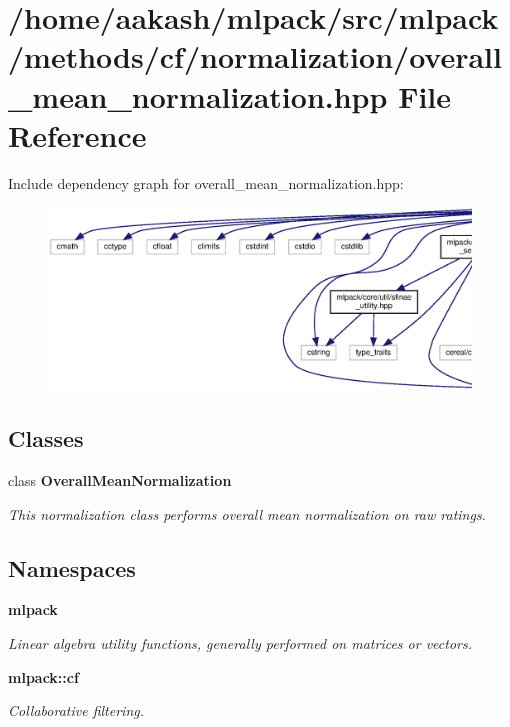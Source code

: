 \section{/home/aakash/mlpack/src/mlpack/methods/cf/normalization/overall\+\_\+mean\+\_\+normalization.hpp File Reference}
\label{overall__mean__normalization_8hpp}
Include dependency graph for overall\+\_\+mean\+\_\+normalization.\+hpp\+:
\nopagebreak
\begin{figure}[H]
\begin{center}
\leavevmode
\includegraphics[width=350pt]{overall__mean__normalization_8hpp__incl}
\end{center}
\end{figure}
\subsection*{Classes}
\begin{DoxyCompactItemize}
\item 
class \textbf{ Overall\+Mean\+Normalization}
\begin{DoxyCompactList}\small\item\em This normalization class performs overall mean normalization on raw ratings. \end{DoxyCompactList}\end{DoxyCompactItemize}
\subsection*{Namespaces}
\begin{DoxyCompactItemize}
\item 
 \textbf{ mlpack}
\begin{DoxyCompactList}\small\item\em Linear algebra utility functions, generally performed on matrices or vectors. \end{DoxyCompactList}\item 
 \textbf{ mlpack\+::cf}
\begin{DoxyCompactList}\small\item\em Collaborative filtering. \end{DoxyCompactList}\end{DoxyCompactItemize}



